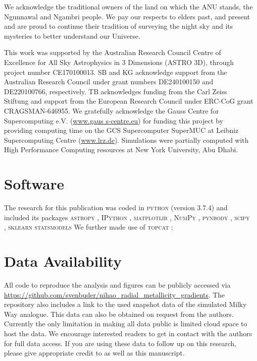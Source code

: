\documentclass[fleqn,usenatbib]{mnras}
\begin{document}
We acknowledge the traditional owners of the land on which the ANU stands, the Ngunnawal and Ngambri people. We pay our respects to elders past, and present and are proud to continue their tradition of surveying the night sky and its mysteries to better understand our Universe.

This work was supported by the Australian Research Council Centre of Excellence for All Sky Astrophysics in 3 Dimensions (ASTRO 3D), through project number CE170100013. SB and KG acknowledge support from the Australian Research Council under grant numbers DE240100150 and DE220100766, respectively. TB acknowledges funding from the Carl Zeiss Stiftung and support from the European Research Council under ERC-CoG grant CRAGSMAN-646955. We gratefully acknowledge the Gauss Centre for Supercomputing e.V. (\url{www.gaus s-centre.eu}) for funding this project by providing computing time on the GCS Supercomputer SuperMUC at Leibniz Supercomputing Centre (\url{www.lrz.de}). Simulations were partially computed with High Performance Computing resources at New York University, Abu Dhabi.

\section*{Software}

The research for this publication was coded in \textsc{python} (version 3.7.4) and included its packages
\textsc{astropy} \citep[v. 3.2.2;][]{Robitaille2013,PriceWhelan2018},
\textsc{IPython} \citep[v. 7.8.0;][]{ipython},
\textsc{matplotlib} \citep[v. 3.1.3;][]{matplotlib},
\textsc{NumPy} \citep[v. 1.17.2;][]{numpy},
\textsc{pynbody} \citep[v. 1.1.0;][]{pynbody},
\textsc{scipy} \citep[v. 1.3.1;][]{Scipy},
\textsc{sklearn} \citep[v. 1.5.1][]{scikit-learn}
\textsc{statsmodels} \citep[v. 0.14.2][]{statsmodels}
We further made use of \textsc{topcat} \citep[version 4.7;][]{Taylor2005};

\section*{Data Availability}

All code to reproduce the analysis and figures can be publicly accessed via \url{https://github.com/svenbuder/nihao_radial_metallicity_gradients}. The repository also includes a link to the used snapshot data of the simulated Milky Way analogue. This data can also be obtained on request from the authors. Currently the only limitation in making all data public is limited cloud space to host the data. We encourage interested readers to get in contact with the authors for full data access. If you are using these data to follow up on this research, please give appropriate credit to \citet{Buck2020b, Buck2021} as well as this manuscript.
\end{document}
